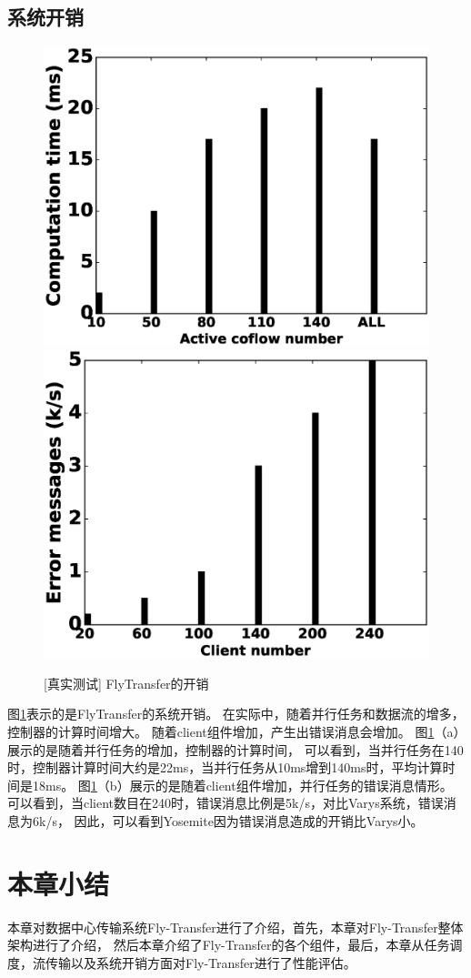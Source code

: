  
 \subsection{系统开销}
 \begin{figure}[h]
  \centering%
      {\includegraphics[width=0.49\columnwidth]{figures/Yosemite/figs/fake/fake5.eps}}
    {\includegraphics[width=0.49\columnwidth]{figures/Yosemite/figs/fake/fake6.eps}}%
   \caption{[真实测试] FlyTransfer的开销}
  \label{Yosemite-evaluation_overhead_fig}
\end{figure}
 图\ref{Yosemite-evaluation_overhead_fig}表示的是FlyTransfer的系统开销。
 在实际中，随着并行任务和数据流的增多，控制器的计算时间增大。
 随着client组件增加，产生出错误消息会增加。
 图\ref{Yosemite-evaluation_overhead_fig}（a）展示的是随着并行任务的增加，控制器的计算时间，
 可以看到，当并行任务在140时，控制器计算时间大约是22ms，当并行任务从10ms增到140ms时，平均计算时间是18ms。
 图\ref{Yosemite-evaluation_overhead_fig}（b）展示的是随着client组件增加，并行任务的错误消息情形。
 可以看到，当client数目在240时，错误消息比例是5k/s，对比Varys系统，错误消息为6k/s，
 因此，可以看到Yosemite因为错误消息造成的开销比Varys小。

\section{本章小结}
本章对数据中心传输系统Fly-Transfer进行了介绍，首先，本章对Fly-Transfer整体架构进行了介绍，
然后本章介绍了Fly-Transfer的各个组件，最后，本章从任务调度，流传输以及系统开销方面对Fly-Transfer进行了性能评估。


 








